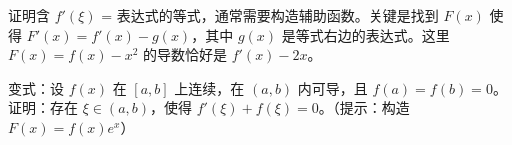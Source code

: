 \begin{enumerate}[itemsep=1.2em, left=0pt, label={}]
\begin{solution}
    \par{}%
    证明含 $f'(\xi)$ = 表达式的等式，通常需要构造辅助函数。关键是找到 $F(x)$ 使得 $F'(x) = f'(x) - g(x)$，其中 $g(x)$ 是等式右边的表达式。这里 $F(x) = f(x) - x^2$ 的导数恰好是 $f'(x) - 2x$。

    \par{}%
    变式：设 $f(x)$ 在 $[a,b]$ 上连续，在 $(a,b)$ 内可导，且 $f(a)=f(b)=0$。证明：存在 $\xi \in (a,b)$，使得 $f'(\xi) + f(\xi) = 0$。（提示：构造 $F(x) = f(x)e^x$）
\end{solution}

\end{enumerate}

